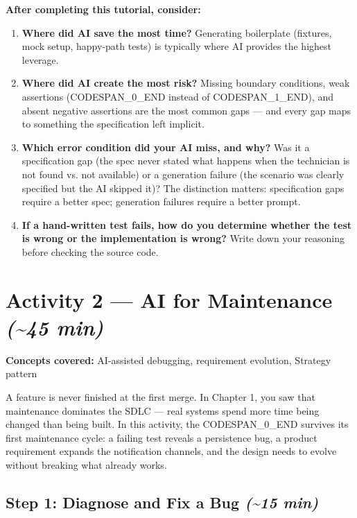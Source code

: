 \documentclass[11pt,a4paper]{book}
\begin{document}
\textbf{After completing this tutorial, consider:}

\begin{enumerate}
  \item \textbf{Where did AI save the most time?} Generating boilerplate (fixtures, mock setup, happy-path tests) is typically where AI provides the highest leverage.
  \item \textbf{Where did AI create the most risk?} Missing boundary conditions, weak assertions (CODESPAN\_0\_END instead of CODESPAN\_1\_END), and absent negative assertions are the most common gaps --- and every gap maps to something the specification left implicit.
  \item \textbf{Which error condition did your AI miss, and why?} Was it a specification gap (the spec never stated what happens when the technician is not found vs. not available) or a generation failure (the scenario was clearly specified but the AI skipped it)? The distinction matters: specification gaps require a better spec; generation failures require a better prompt.
  \item \textbf{If a hand-written test fails, how do you determine whether the test is wrong or the implementation is wrong?} Write down your reasoning before checking the source code.
\end{enumerate}

\medskip

\section{Activity 2 --- AI for Maintenance \textit{(\textasciitilde{}45 min)}}

\textbf{Concepts covered:} AI-assisted debugging, requirement evolution, Strategy pattern

A feature is never finished at the first merge. In Chapter 1, you saw that maintenance dominates the SDLC --- real systems spend more time being changed than being built. In this activity, the CODESPAN\_0\_END survives its first maintenance cycle: a failing test reveals a persistence bug, a product requirement expands the notification channels, and the design needs to evolve without breaking what already works.

\subsection{Step 1: Diagnose and Fix a Bug \textit{(\textasciitilde{}15 min)}}
\end{document}
